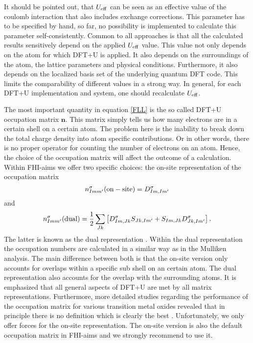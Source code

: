 It should be pointed out, that $U_{\rm eff}$ can be seen as an effective value of the coulomb interaction that also includes exchange corrections. This parameter has to be specified by hand, so far, no possibility is implemented to calculate this parameter self-consistently. Common to all approaches is that all the calculated results sensitively depend on the applied $U_{\rm eff}$ value. This value not only depends on the atom for which DFT+U is applied. It also depends on the surroundings of the atom, the lattice parameters and physical conditions. Furthermore, it also depends on the localized basis set of the underlying quantum DFT code. This limits the comparability of different values in a strong way. In general, for each DFT+U implementation and system, one should recalculate $U_{\rm eff}$.

The most important quantity in equation \ref{FLL} is the so called DFT+U occupation matrix $\mathbf{n}$. This matrix simply tells us how many electrons are in a certain shell on a certain atom. The problem here is the inability to break down the total charge density into atom specific contributions. Or in other words, there is no proper operator for counting the number of electrons on an atom. Hence, the choice of the occupation matrix will affect the outcome of a calculation. Within FHI-aims we offer two specific choices: the on-site representation of the occupation matrix 
\begin{align}
   \label{general_occ_mat}
n^{\sigma}_{Imm'} ({\rm on-site}) = D^{\sigma}_{Im,Im'}
   \end{align}
and 
\begin{align}
n_{Imm'}^{\sigma} ({\rm dual}) = \frac{1}{2} \sum _{Jk} \left[ D^{\sigma}_{Im,Jk}S_{Jk,Im'} + S_{Im,Jk}D^{\sigma}_{Jk,Im'}\right] .
\end{align}
The latter is known as the dual representation \cite{dual_paper}. Within the dual representation the occupation numbers are calculated in a similar way as in the Mulliken analysis. The main difference between both is that the on-site version only accounts for overlaps within a specific sub shell on an certain atom. The dual representation also accounts for the overlap with the surrounding atoms. It is emphasized that all general aspects of DFT+U are met by all matrix representations. Furthermore, more detailed studies regarding the performance of the occupation matrix for various transition metal oxides revealed that  in principle there is no definition which is clearly the best  \cite{tablero}. Unfortunately, we only offer forces for the on-site representation. The on-site version is also the default occupation matrix in FHI-aims and we strongly recommend to use it.


